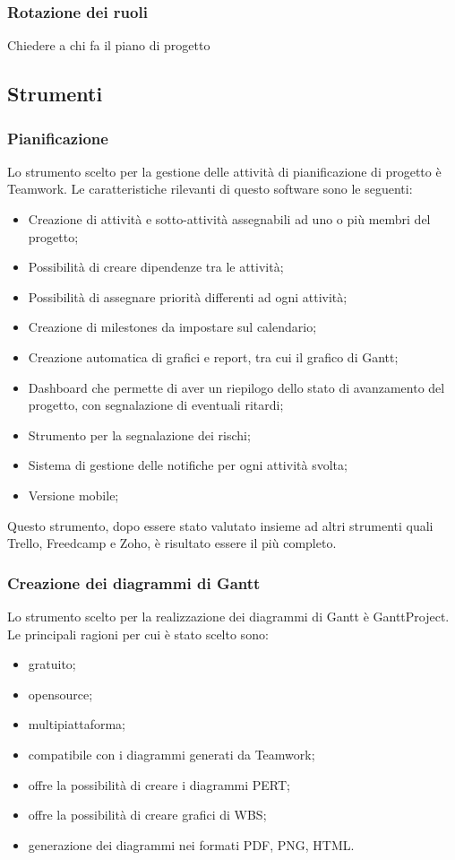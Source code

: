 \documentclass[../NormeProgetto.tex]{subfiles}
\begin{document}
		\subsubsection{Rotazione dei ruoli}
		Chiedere a chi fa il piano di progetto
		
		
		\subsection{Strumenti}
		
		\subsubsection{Pianificazione} \label{sec: Pianificazione Teamwork}
		Lo strumento scelto per la gestione delle attività di pianificazione di progetto è Teamwork. Le caratteristiche rilevanti di questo software sono le seguenti:
		\begin{itemize}
		\item Creazione di attività e sotto-attività assegnabili ad uno o più membri del progetto;
		\item Possibilità di creare dipendenze tra le attività;
		\item Possibilità di assegnare priorità differenti ad ogni attività;
		\item Creazione di milestones da impostare sul calendario;
		\item Creazione automatica di grafici e report, tra cui il grafico di Gantt;
		\item Dashboard che permette di aver un riepilogo dello stato di avanzamento del progetto, con segnalazione di eventuali ritardi;
		\item Strumento per la segnalazione dei rischi;
		\item Sistema di gestione delle notifiche per ogni attività svolta;
		\item Versione mobile;
		\end{itemize}		 
Questo strumento, dopo essere stato valutato insieme ad altri strumenti quali Trello, Freedcamp e Zoho, è risultato essere il più completo.
		
		\subsubsection{Creazione dei diagrammi di Gantt}
		Lo strumento scelto per la realizzazione dei diagrammi di Gantt è GanttProject. Le principali ragioni per cui è stato scelto sono:
		\begin{itemize}
			\item gratuito;
			\item opensource;
			\item multipiattaforma;
			\item compatibile con i diagrammi generati da Teamwork;
			\item offre la possibilità di creare i diagrammi PERT;
			\item offre la possibilità di creare grafici di WBS;
			\item generazione dei diagrammi nei formati PDF, PNG, HTML.
		\end{itemize}
		
\end{document}
